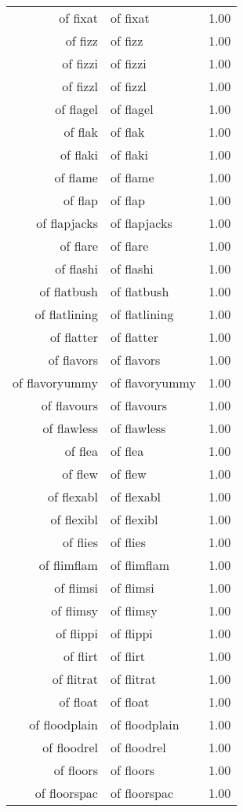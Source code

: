 \begin{table}[ht]
\begin{tabular}{rlr}
  of fixat & of fixat & 1.00 \\ 
  of fizz & of fizz & 1.00 \\ 
  of fizzi & of fizzi & 1.00 \\ 
  of fizzl & of fizzl & 1.00 \\ 
  of flagel & of flagel & 1.00 \\ 
  of flak & of flak & 1.00 \\ 
  of flaki & of flaki & 1.00 \\ 
  of flame & of flame & 1.00 \\ 
  of flap & of flap & 1.00 \\ 
  of flapjacks & of flapjacks & 1.00 \\ 
  of flare & of flare & 1.00 \\ 
  of flashi & of flashi & 1.00 \\ 
  of flatbush & of flatbush & 1.00 \\ 
  of flatlining & of flatlining & 1.00 \\ 
  of flatter & of flatter & 1.00 \\ 
  of flavors & of flavors & 1.00 \\ 
  of flavoryummy & of flavoryummy & 1.00 \\ 
  of flavours & of flavours & 1.00 \\ 
  of flawless & of flawless & 1.00 \\ 
  of flea & of flea & 1.00 \\ 
  of flew & of flew & 1.00 \\ 
  of flexabl & of flexabl & 1.00 \\ 
  of flexibl & of flexibl & 1.00 \\ 
  of flies & of flies & 1.00 \\ 
  of flimflam & of flimflam & 1.00 \\ 
  of flimsi & of flimsi & 1.00 \\ 
  of flimsy & of flimsy & 1.00 \\ 
  of flippi & of flippi & 1.00 \\ 
  of flirt & of flirt & 1.00 \\ 
  of flitrat & of flitrat & 1.00 \\ 
  of float & of float & 1.00 \\ 
  of floodplain & of floodplain & 1.00 \\ 
  of floodrel & of floodrel & 1.00 \\ 
  of floors & of floors & 1.00 \\ 
  of floorspac & of floorspac & 1.00 \\ 

\end{tabular}
\end{table}
